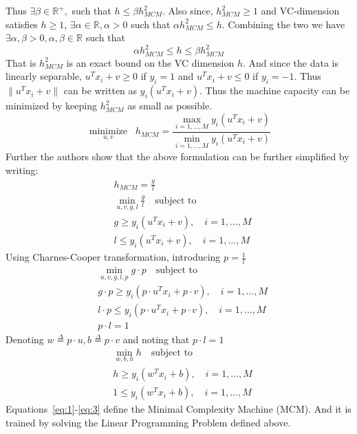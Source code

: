 \documentclass[11pt]{article}
\begin{document}
Thus $\exists\beta\in\mathbb{R}^+,$ such that $h\le\beta h_{MCM}^2$. Also since,
$h_{MCM}^2\ge 1$ and VC-dimension satisfies $h\ge 1$,
$\exists\alpha\in\mathbb{R},\alpha>0$ such that $\alpha h_{MCM}^2\le h$.
Combining the two we have $\exists \alpha,\beta > 0, \alpha,\beta\in\mathbb{R}$
such that
\begin{equation}
    \alpha h_{MCM}^2\le h\le\beta h_{MCM}^2
\end{equation}
That is $h^2_{MCM}$ is an exact bound on the VC dimension $h$. And since the
data is linearly separable, $u^Tx_i+v\ge 0$ if $y_i=1$ and $u^Tx_i+v\le 0$ if
$y_i=-1$. Thus $\lVert u^Tx_i+v\rVert$ can be written as $y_i(u^Tx_i+v)$. Thus
the machine capacity can be minimized by keeping $h_{MCM}^2$ as small as
possible.
\begin{equation}
    \underset{u,v}{\operatorname{minimize}}\;\; h_{MCM}=\frac{\max_{i=1,\dotsc,M}y_i(u^Tx_i+v)}{\min_{i=1,\dotsc,M}y_i(u^Tx_i+v)}
\end{equation}
Further the authors show that the above formulation can be further simplified
by writing:
\begin{align}
    &h_{MCM}=\frac{g}{l}\\
    &\min_{u,v,g,l}\frac{g}{l}\quad\text{subject to}\\
    &g\ge y_i(u^Tx_i+v),\quad i=1,\dotsc,M\\
    &l\le y_i(u^Tx_i+v),\quad i=1,\dotsc,M
\end{align}
Using Charnes-Cooper transformation, introducing $p=\frac{1}{l}$
\begin{align}
    &\min_{u,v,g,l,p}g\cdot p\quad\text{subject to}\\
    &g\cdot p\ge y_i(p\cdot u^Tx_i+p\cdot v),\quad i=1,\dotsc,M\\
    &l\cdot p\le y_i(p\cdot u^Tx_i+p\cdot v),\quad i=1,\dotsc,M\\
    &p\cdot l=1
\end{align}
Denoting $w\stackrel{\Delta}{=}p\cdot u,b\stackrel{\Delta}{=}p\cdot v$ and
noting that $p\cdot l=1$
\begin{align}
    &\label{eq:1}\min_{w,b,h}h\quad\text{subject to}\\
    &\label{eq:2}h\ge y_i(w^Tx_i+b),\quad i=1,\dotsc,M\\
    &\label{eq:3}1\le y_i(w^Tx_i+b),\quad i=1,\dotsc,M
\end{align}
Equations~\ref{eq:1}-\ref{eq:3} define the Minimal Complexity Machine (MCM). And
it is trained by solving the Linear Programming Problem defined above.
\end{document}
